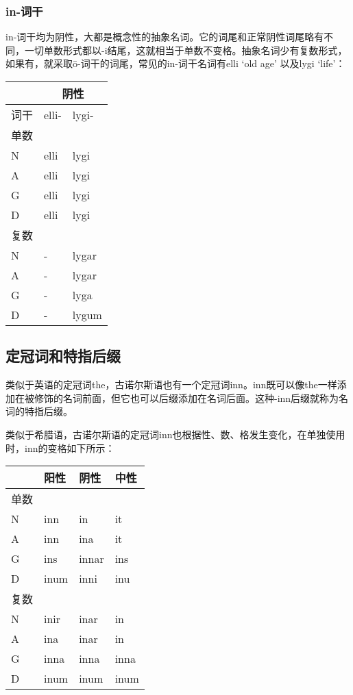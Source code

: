 \subsubsection{in-词干}\label{in-ux8bcdux5e72}

in-词干均为阴性，大都是概念性的抽象名词。它的词尾和正常阴性词尾略有不同，一切单数形式都以-i结尾，这就相当于单数不变格。抽象名词少有复数形式，如果有，就采取ō-词干的词尾，常见的in-词干名词有elli
`old age' 以及lygi `life'：

\begin{longtable}{lll}
\toprule
 &\multicolumn{2}{c}{阴性} \\
\midrule
\endhead
\bottomrule
\endfoot
词干 & elli- & lygi- \\
单数 & & \\
N & elli & lygi \\
A & elli & lygi \\
G & elli & lygi \\
D & elli & lygi \\
复数 & & \\
N & - & lygar \\
A & - & lygar \\
G & - & lyga \\
D & - & lygum \\
\end{longtable}

\subsection{定冠词和特指后缀}\label{ux5b9aux51a0ux8bcdux548cux7279ux6307ux540eux7f00}

类似于英语的定冠词the，古诺尔斯语也有一个定冠词inn。inn既可以像the一样添加在被修饰的名词前面，但它也可以后缀添加在名词后面。这种-inn后缀就称为名词的特指后缀。

类似于希腊语，古诺尔斯语的定冠词inn也根据性、数、格发生变化，在单独使用时，inn的变格如下所示：

\begin{longtable}{llll}
\toprule
 & 阳性 & 阴性 & 中性 \\
\midrule
\endhead
\bottomrule
\endfoot
单数 & & & \\
N & inn & in & it \\
A & inn & ina & it \\
G & ins & innar & ins \\
D & inum & inni & inu \\
复数 & & & \\
N & inir & inar & in \\
A & ina & inar & in \\
G & inna & inna & inna \\
D & inum & inum & inum \\
\end{longtable}


